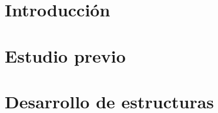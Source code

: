 \documentclass[spanish,a4paper,12pt,oneside]{extreport}
\begin{document}

\renewcommand{\thepage}{\roman{page}}
\setcounter{page}{1}
\pagestyle{plain} 


\tableofcontents

\newpage{\pagestyle{empty}}

\listoffigures

\newpage{\pagestyle{empty}}

\listoftables

\newpage{\pagestyle{empty}}

\newpage
\thispagestyle{empty}

\renewcommand{\thepage}{\arabic{page}}
\setcounter{page}{1}
\pagestyle{plain}

\chapter{\LARGE Introducción}
\label{chapter:intro}



\newpage{\pagestyle{empty}}
\thispagestyle{empty}

\chapter{\LARGE Estudio previo}
\label{chapter:estudioPrevio}



\newpage{\pagestyle{empty}}
\thispagestyle{empty}

\chapter{\LARGE Desarrollo de estructuras}
\label{chapter:desarrolloEstructuras}
\end{document}
